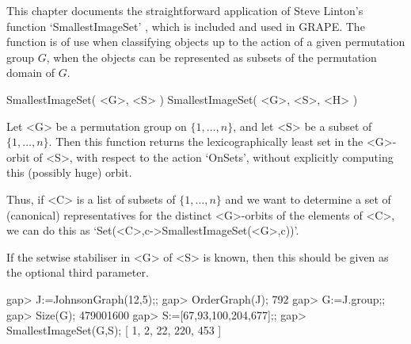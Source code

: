 %
%
%
%
\def\GRAPE{\sf GRAPE}
\def\nauty{\it nauty}
\def\G{\Gamma}
\def\Aut{{\rm Aut}\,}
\def\x{\times}

This chapter documents the straightforward application of Steve Linton's
function `SmallestImageSet' \cite{Lin04}, which is included and used
in {\GRAPE}. The function is of use when classifying objects up to
the action of a given permutation group $G$, when the objects can be
represented as subsets of the permutation domain of $G$.


\>SmallestImageSet( <G>, <S> )
\>SmallestImageSet( <G>, <S>, <H> )

Let <G> be a permutation group on $\{1,\ldots,n\}$, and let <S>
be a subset of $\{1,\ldots,n\}$. Then this function returns the
lexicographically least set in the <G>-orbit of <S>, with respect to the
action `OnSets', without explicitly computing this (possibly huge) orbit.

Thus, if <C> is a list of subsets of $\{1,\ldots,n\}$ and we
want to determine a set of (canonical) representatives for the
distinct <G>-orbits of the elements of <C>, we can do this as
`Set(<C>,c->SmallestImageSet(<G>,c))'.

If the setwise stabiliser in <G> of <S> is known, then this should be
given as the optional third parameter.

\beginexample
gap> J:=JohnsonGraph(12,5);;
gap> OrderGraph(J);
792
gap> G:=J.group;;
gap> Size(G);
479001600
gap> S:=[67,93,100,204,677];;
gap> SmallestImageSet(G,S);
[ 1, 2, 22, 220, 453 ]
\endexample

